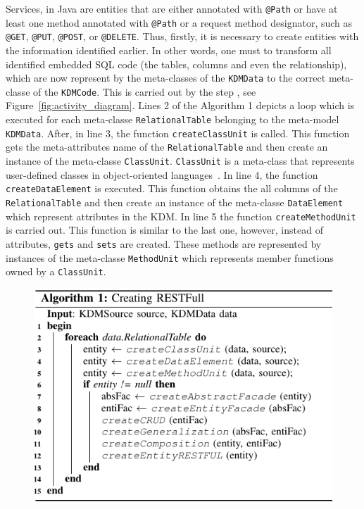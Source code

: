 \documentclass[a4paper,twoside]{article}
\newcommand*\circled[1]{\tikz[baseline=(char.base)]{
  \node[shape=circle,draw, inner sep=0.1pt] (char) {#1};}
}
\begin{document}
Services, in Java are entities that are either annotated with \texttt{@Path} or have at least one method annotated with \texttt{@Path} or a request method designator, such as \texttt{@GET}, \texttt{@PUT}, \texttt{@POST}, or \texttt{@DELETE}. Thus, firstly, it is necessary to create entities with the information identified earlier. In other words, one must to transform all identified embedded SQL code (the tables, columns and even the relationship), which are now represent by the meta-classes of the \texttt{KDMData} to the correct meta-classe of the \texttt{KDMCode}. This is carried out by the step \circled{\textbf{G}}, see Figure~\ref{fig:activity_diagram}. Lines 2 of the Algorithm 1 depicts a loop which is executed for each meta-classe \texttt{RelationalTable} belonging to the meta-model \texttt{KDMData}. After, in line 3, the function \texttt{createClassUnit} is called. This function gets the meta-attributes name of the \texttt{RelationalTable} and then create an instance of the meta-classe \texttt{ClassUnit}. \texttt{ClassUnit} is a meta-class that represents user-defined classes in object-oriented languages~\cite{5328801}. In line 4, the function \texttt{createDataElement} is executed. This function obtains the all columns of the \texttt{RelationalTable} and then create an instance of the meta-classe \texttt{DataElement} which represent attributes in the KDM. In line 5 the function \texttt{createMethodUnit} is carried out. This function is similar to the last one, however, instead of attributes, \texttt{gets} and \texttt{sets} are created. These methods are represented by instances of the meta-classe \texttt{MethodUnit} which represents member functions owned by a \texttt{ClassUnit}.

\begin{figure}
\centering
  \includegraphics[scale=0.78]{figuras/alg}
\end{figure}
\end{document}
